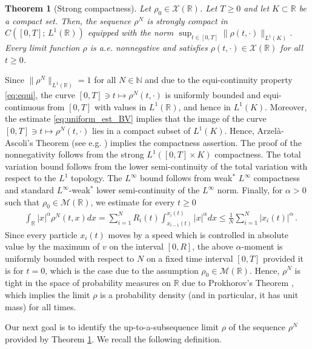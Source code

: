 \documentclass[reqno,oneside]{amsart}
\theoremstyle{plain}
\newtheorem{theorem}{Theorem}[section]
\newcommand{\R}{\mathbb{R}}
\newcommand{\N}{\mathbb{N}}
\begin{document}
\begin{theorem}[Strong compactness]\label{thm:compactness}
   Let $\rho_0\in \mathcal{X}(\R)$. Let $T\geq 0$ and let $K\subset \R$ be a compact set. Then, the sequence $\rho^N$ is strongly compact in $C([0,T];\,L^1(\R))$ equipped with the norm $\sup_{t\in [0,T]}\|\rho(t,\cdot)\|_{L^1(K)}$. Every limit function $\rho$ is a.e. nonnegative and satisfies $\rho(t,\cdot)\in \mathcal{X}(\R)$ for all $t\geq 0$.
\end{theorem}

\proof
Since $\|\rho^N\|_{L^1(\R)}=1$ for all $N\in \N$ and due to the equi-continuity property \eqref{eq:equi}, the curve $[0,T]\ni t\mapsto \rho^N(t,\cdot)$ is uniformly bounded and equi-continuous from $[0,T]$ with values in  $L^1(\R)$, and hence in $L^1(K)$. Moreover, the estimate \eqref{eq:uniform_est_BV} implies that the image of the curve $[0,T]\ni t\mapsto \rho^N(t,\cdot)$ lies in a compact subset of $L^1(K)$. Hence, Arzelà-Ascoli's Theorem (see e.g. \cite[Proposition 3.3.1]{AGS}) implies the compactness assertion. The proof of the nonnegativity follows from the strong $L^1([0,T]\times K)$ compactness. The total variation bound follows from the lower semi-continuity of the total variation with respect to the $L^1$ topology. The $L^\infty$ bound follows from weak$^*$ $L^\infty$ compactness and standard $L^\infty$-weak$^*$ lower semi-continuity of the $L^\infty$ norm. Finally, for $\alpha>0$ such that $\rho_0\in\mathcal{M}(\R)$, we estimate for every $t\geq 0$
\begin{align*}
    & \int_\R |x|^\alpha \rho^N(t,x) dx = \sum_{i=1}^N R_i(t) \int_{x_{i-1}(t)}^{x_i(t)}|x|^\alpha dx\leq \frac{1}{N}\sum_{i=1}^N |x_i(t)|^\alpha\,.
\end{align*}
Since every particle $x_i(t)$ moves by a speed which is controlled in absolute value by the maximum of $v$ on the interval $[0,R]$, the above $\alpha$-moment is uniformly bounded with respect to $N$ on a fixed time interval $[0,T]$ provided it is for $t=0$, which is the case due to the assumption $\rho_0\in\mathcal{M}(\R)$. Hence, $\rho^N$ is tight in the space of probability measures on $\R$ due to Prokhorov's Theorem \cite{AGS}, which implies the limit $\rho$ is a probability density (and in particular, it has unit mass) for all times.
\endproof

Our next goal is to identify the up-to-a-subsequence limit $\rho$ of the sequence $\rho^N$ provided by Theorem \ref{thm:compactness}. We recall the following definition.
\end{document}

